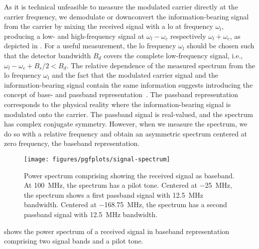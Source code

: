 As it is technical unfeasible to measure the modulated carrier directly at the carrier frequency, we demodulate or downconvert the information-bearing signal from the carrier by mixing the received signal with a \gls{lo} at frequency $\omega_l$, producing a low- and high-frequency signal at $\omega_l-\omega_c$ respectively $\omega_l+\omega_c$, as depicted in .
For a useful measurement, the \gls{lo} frequency $\omega_l$ should be chosen such that the detector bandwidth $B_d$ covers the complete low-frequency signal, i.e., $\omega_l-\omega_c+B_s/2<B_d$.
The relative dependence of the measured spectrum from the \gls{lo} frequency $\omega_l$ and the fact that the modulated carrier signal and the information-bearing signal contain the same information suggests introducing the concept of base- and passband representation~\cite{Madhow2008}.
The passband representation corresponds to the physical reality where the information-bearing signal is modulated onto the carrier.
The passband signal is real-valued, and the spectrum has complex conjugate symmetry.
However, when we measure the spectrum, we do so with a relative frequency and obtain an asymmetric spectrum centered at zero frequency, the baseband representation.
\begin{figure}[ht]
	\centering
	\texttt{[image: figures/pgfplots/signal-spectrum]}
	\caption{Power spectrum comprising showing the received signal as baseband. At \SI{+100}{\mega\hertz}, the spectrum has a pilot tone. Centered at \SI{-25}{\mega\hertz}, the spectrum shows a first passband signal with \SI{12.5}{\mega\hertz} bandwidth. Centered at \SI{-168.75}{\mega\hertz}, the spectrum has a second passband signal with \SI{12.5}{\mega\hertz} bandwidth.}\label{fig:signal_spectrum}
\end{figure}
 shows the power spectrum of a received signal in baseband representation comprising two signal bands and a pilot tone.


